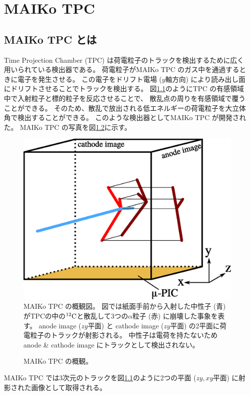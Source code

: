 \chapter{MAIKo TPC}
\section{MAIKo TPC とは}
Time Projection Chamber (TPC) は荷電粒子のトラックを検出するために広く用いられている検出器である。
荷電粒子がMAIKo TPC のガス中を通過するときに電子を発生させる。
この電子をドリフト電場 ($y$軸方向) により読み出し面にドリフトさせることでトラックを検出する。
図\ref{fig::MAIKo_view}のようにTPC の有感領域中で入射粒子と標的粒子を反応させることで、
散乱点の周りを有感領域で覆うことができる。
そのため、散乱で放出される低エネルギーの荷電粒子を大立体角で検出することができる。
このような検出器としてMAIKo TPC が開発された。
MAIKo TPC の写真を図\ref{pic::MAIKo}に示す。
\begin{figure}
  \centering
  \includegraphics[clip, width=0.7\columnwidth]{eps/MAIKo2.eps}
  \caption[MAIKo TPC の概観図。]{MAIKo TPC の概観図。
    図では紙面手前から入射した中性子 (青) がTPCの中の${}^{12}{\rm C}$と散乱して3つの$\alpha$粒子 (赤) に崩壊した事象を表す。
    anode image ($zy$平面) と cathode image ($zy$平面) の2平面に荷電粒子のトラックが射影される。
    中性子は電荷を持たないためanode \& cathode image にトラックとして検出されない。
  }
  \label{fig::MAIKo_view}
\end{figure}
\begin{figure}
  \centering
  \caption[MAIKo TPC の概観。]{MAIKo TPC の概観。}
  \label{pic::MAIKo}
\end{figure}
MAIKo TPC では3次元のトラックを図\ref{fig::MAIKo_view}のように2つの平面 ($zy, xy$平面) に射影された画像として取得される。

